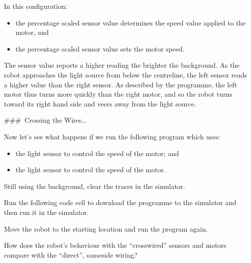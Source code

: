 \documentclass[letterpaper,10pt,english]{sphinxmanual}
\begin{document}
In this configuration:
\begin{itemize}
\item {} 
the percentage scaled  sensor value determines the speed value applied to the  motor, and

\item {} 
the percentage scaled  sensor value sets the  motor speed.

\end{itemize}

The sensor value reports a higher reading the brighter the background. As the robot approaches the light source from below the centreline, the left sensor reads a higher value than the right sensor. As described by the programme, the left motor thus turns more quickly than the right motor, and so the robot turns toward its right hand side and veers away from the light source.

\#\#\# Crossing the Wires…

Now let’s see what happens if we run the following program which uses:
\begin{itemize}
\item {} 
the  light sensor to control the speed of the  motor; and

\item {} 
the  light sensor to control the speed of the  motor.

\end{itemize}

Still using the  background, clear the traces in the simulator.

Run the following code cell to download the programme to the simulator and then run it in the simulator.

Move the robot to the starting location  and run the program again.

How does the robot’s behaviour with the “cross\sphinxhyphen{}wired” sensors and motors compare with the “direct”, same\sphinxhyphen{}side wiring?
\end{document}
